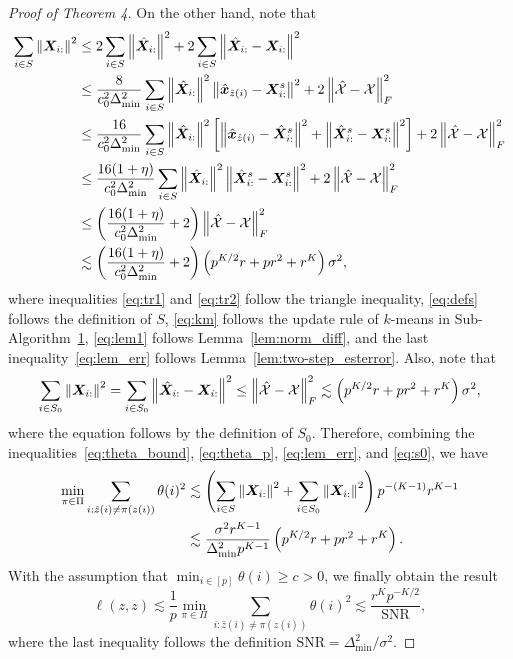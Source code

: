 \documentclass[lettersize,journal]{IEEEtran}
\theoremstyle{definition}
\theoremstyle{definition}
\newcommand{\of}[1]{\left(#1\right)}
\newcommand{\off}[1]{\left[#1\right]}
\begin{document}
\begin{proof}[Proof of Theorem 4]
    On the other hand, note that 
    \begin{align}
         \sum_{i \in S} \onorm{\mX_{i:}}^2 & \leq 2 \sum_{i \in S} \onorm{\hat \mX_{i:}}^2  +  2\sum_{i \in S} \onorm{\hat \mX_{i:} - \mX_{i:}}^2 \label{eq:tr1}\\
         & \leq \frac{8}{c_0^2 \Delta_{\min}^2  } \sum_{i \in S} \onorm{\hat \mX_{i:}}^2   \onorm{\hat \mx_{\hat z(i)} - \mX_{i:}^s }^2 +2 \onorm{\hat \tX - \tX}_F^2 \label{eq:defs} \\
         & \leq \frac{16}{c_0^2 \Delta_{\min}^2  }\sum_{i \in S} \onorm{\hat \mX_{i:}}^2  \off{ \onorm{\hat \mx_{\hat z(i)} - \hat \mX_{i:}^s }^2 + \onorm{\hat \mX_{i:}^s - \mX_{i:}^s }^2 } + 2\onorm{\hat \tX - \tX}_F^2 \label{eq:tr2} \\
         & \leq  \frac{16(1 + \eta)}{c_0^2 \Delta_{\min}^2 }\sum_{i \in S} \onorm{\hat \mX_{i:}}^2  \onorm{\hat \mX_{i:}^s - \mX_{i:}^s }^2  + 2\onorm{\hat \tX - \tX}_F^2 \label{eq:km} \\
         & \leq \of{ \frac{16(1 + \eta)}{c_0^2 \Delta_{\min}^2 } + 2 }\onorm{\hat \tX - \tX}_F^2 \label{eq:lem1}\\
         & \lesssim \of{ \frac{16(1 + \eta)}{c_0^2 \Delta_{\min}^2 } + 2 } \of{ p^{K/2}r + pr^2 + r^K } \sigma^2 \label{eq:lem_err},
    \end{align}
    where inequalities \eqref{eq:tr1} and \eqref{eq:tr2} follow the triangle inequality, \eqref{eq:defs} follows the definition of $S$, \eqref{eq:km} follows the update rule of $k$-means in Sub-Algorithm~\hyperref[alg:main]{1}, \eqref{eq:lem1} follows Lemma~\ref{lem:norm_diff}, and the last inequality~\eqref{eq:lem_err} follows Lemma~\ref{lem:two-step_esterror}. Also, note that 
    \begin{equation}\label{eq:s0}
         \sum_{i \in S_0} \onorm{\mX_{i:}}^2 =  \sum_{i \in S_0} \onorm{\hat \mX_{i:}- \mX_{i:}}^2 \leq \onorm{\hat \tX - \tX}_F^2 \lesssim \of{ p^{K/2}r + pr^2 + r^K } \sigma^2,
    \end{equation}
    where the equation follows by the definition of $S_0$. Therefore, combining the inequalities~\eqref{eq:theta_bound}, \eqref{eq:theta_p}, \eqref{eq:lem_err}, and \eqref{eq:s0}, we have 
    \begin{align}
        \min_{\pi \in \Pi} \sum_{i : \hat z(i) \neq \pi(z(i))} \theta(i)^2  &\lesssim \of{\sum_{i \in S} \onorm{\mX_{i:}}^2 + \sum_{i \in S_0} \onorm{\mX_{i:}}^2  } p^{-(K-1)} r^{K-1} \\
        & \lesssim \frac{\sigma^2 r^{K-1}}{ \Delta_{\min}^2  p^{K-1} } \of{ p^{K/2}r + pr^2 + r^K }.
    \end{align}
    With the assumption that $\min_{i \in [p]} \theta(i) \geq c >0$, we finally obtain the result
    \begin{equation}
        \ell(z, z) \lesssim \frac{1}{p}\min_{\pi \in \Pi} \sum_{i : \hat z(i) \neq \pi(z(i))} \theta(i)^2 \lesssim \frac{r^K p^{-K/2} }{ \text{SNR} },
    \end{equation}
    where the last inequality follows the definition $\text{SNR} = \Delta_{\min}^2/\sigma^2$.
\end{proof}
\end{document}
